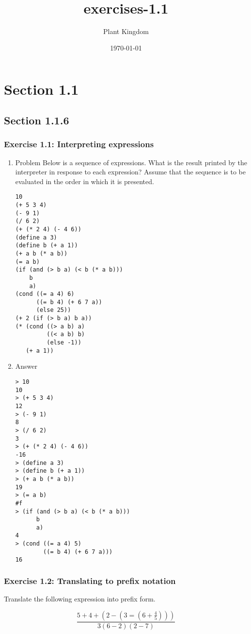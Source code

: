 \documentclass[11pt]{article}
\author{Plant Kingdom}
\date{\today}
\title{exercises-1.1}
\begin{document}
\maketitle
\tableofcontents

\section{Section 1.1}
\label{sec-1}
\subsection{Section 1.1.6}
\label{sec-1-1}
\subsubsection{Exercise 1.1: Interpreting expressions}
\label{sec-1-1-1}
\begin{enumerate}
\item Problem
\label{sec-1-1-1-1}
Below is a sequence of expressions.  What is the
result printed by the interpreter in response to each expression?
Assume that the sequence is to be evaluated in the order in which
it is presented.

\begin{verbatim}
10
(+ 5 3 4)
(- 9 1)
(/ 6 2)
(+ (* 2 4) (- 4 6))
(define a 3)
(define b (+ a 1))
(+ a b (* a b))
(= a b)
(if (and (> b a) (< b (* a b)))
    b
    a)
(cond ((= a 4) 6)
      ((= b 4) (+ 6 7 a))
      (else 25))
(+ 2 (if (> b a) b a))
(* (cond ((> a b) a)
         ((< a b) b)
         (else -1))
   (+ a 1))
\end{verbatim}
\item Answer
\label{sec-1-1-1-2}

\begin{verbatim}
> 10
10
> (+ 5 3 4)
12
> (- 9 1)
8
> (/ 6 2)
3
> (+ (* 2 4) (- 4 6))
-16
> (define a 3)
> (define b (+ a 1))
> (+ a b (* a b))
19
> (= a b)
#f
> (if (and (> b a) (< b (* a b)))
      b
      a)
4
> (cond ((= a 4) 5)
        ((= b 4) (+ 6 7 a)))
16
\end{verbatim}
\end{enumerate}
\subsubsection{Exercise 1.2: Translating to prefix notation}
\label{sec-1-1-2}

Translate the following expression into prefix form.

$$\frac{5 + 4 + ( 2 - (3 = (6 + \frac{4}{5})))}{3 (6 - 2)(2 - 7)}$$
\end{document}
